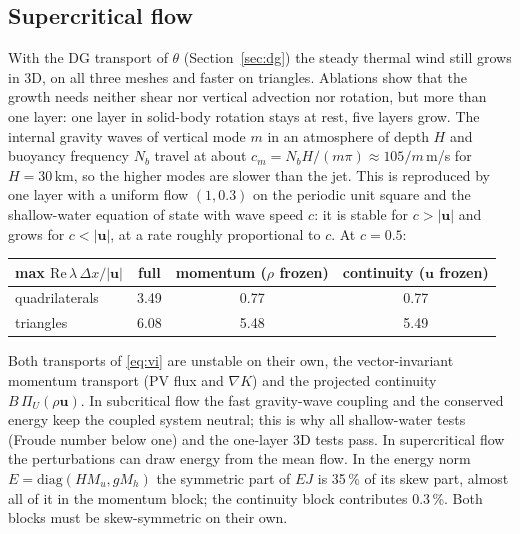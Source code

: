 \documentclass[preprint,12pt]{elsarticle}
\newcommand{\bu}{\mathbf{u}}
\theoremstyle{definition}
\begin{document}
\subsection{Supercritical flow}\label{sec:supercritical}
With the DG transport of $\theta$ (Section~\ref{sec:dg}) the steady thermal wind still grows in 3D, on all
three meshes and faster on triangles. Ablations show that the growth needs neither shear nor vertical
advection nor rotation, but more than one layer: one layer in solid-body rotation stays at rest, five layers
grow. The internal gravity waves of vertical mode $m$ in an atmosphere of depth $H$ and buoyancy frequency
$N_b$ travel at about $c_m = N_bH/(m\pi)\approx 105/m$\,m/s for $H = 30$\,km, so the higher modes are slower
than the jet. This is reproduced by one layer with a uniform flow $(1, 0.3)$ on the periodic unit square and
the shallow-water equation of state with wave speed $c$: it is stable for $c > |\bu|$ and grows for
$c < |\bu|$, at a rate roughly proportional to $c$. At $c = 0.5$:
\begin{center}\small
\begin{tabular}{lccc}
\toprule
max $\mathrm{Re}\,\lambda\,\Delta x/|\bu|$ & full & momentum ($\rho$ frozen) & continuity ($\bu$ frozen) \\
\midrule
quadrilaterals & 3.49 & 0.77 & 0.77 \\
triangles & 6.08 & 5.48 & 5.49 \\
\bottomrule
\end{tabular}
\end{center}
Both transports of \eqref{eq:vi} are unstable on their own, the vector-invariant momentum transport (PV flux
and $\nabla K$) and the projected continuity $B\,\Pi_U(\rho\bu)$. In subcritical flow the fast gravity-wave
coupling and the conserved energy keep the coupled system neutral; this is why all shallow-water tests (Froude
number below one) and the one-layer 3D tests pass. In supercritical flow the perturbations can draw energy
from the mean flow. In the energy norm $E = \mathrm{diag}(H M_u, g M_h)$ the symmetric part of $EJ$ is
35\,\% of its skew part, almost all of it in the momentum block; the continuity block contributes 0.3\,\%.
Both blocks must be skew-symmetric on their own.
\end{document}

